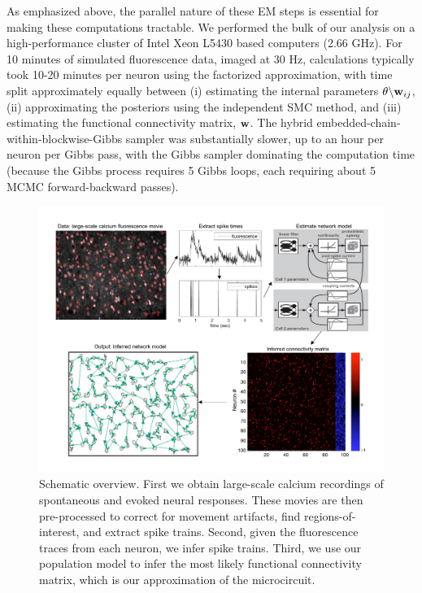 As emphasized above, the parallel nature of these EM steps is essential for making these computations tractable. We performed the bulk of our analysis on a high-performance cluster of Intel Xeon L5430 based computers (2.66 GHz). For 10 minutes of simulated fluorescence data, imaged at $30$ Hz, calculations typically took 10-20 minutes per neuron using the factorized approximation, with time split approximately equally between (i) estimating the internal parameters $\theta \backslash \mathbf{w}_{ij}$, (ii) approximating the posteriors using the independent SMC method, and (iii) estimating the functional connectivity matrix, $\mathbf{w}$. The hybrid embedded-chain-within-blockwise-Gibbs sampler was substantially slower, up to an hour per neuron per Gibbs pass, with the Gibbs sampler dominating the computation time (because the Gibbs process requires 5 Gibbs loops, each requiring about 5 MCMC forward-backward passes).

\begin{figure}[h]
\centering \includegraphics[width=\hsize]{../figs/yuri-paper-schematic}
\caption{Schematic overview. First we obtain large-scale calcium recordings of spontaneous 
and evoked neural responses.  These movies are then pre-processed to correct for movement artifacts, find regions-of-interest, and extract spike trains.  Second, given the fluorescence traces from each neuron, we infer spike trains.  Third, we use our population model to infer the most likely functional connectivity matrix, which is our approximation of the microcircuit.}
\label{fig:data_schematic}
\end{figure}


